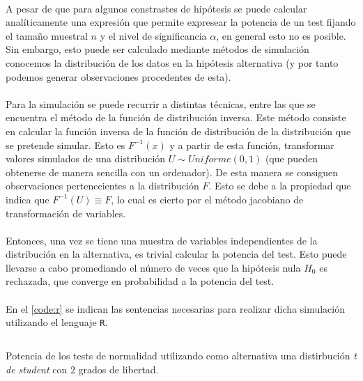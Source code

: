 \documentclass[a4paper, spanish]{article}
\begin{document}
    \paragraph{}
    A pesar de que para algunos constrastes de hipótesis se puede calcular analíticamente una expresión que permite expresear la potencia de un test fijando el tamaño muestral $n$ y el nivel de significancia $\alpha$, en general esto no es posible. Sin embargo, esto puede ser calculado mediante métodos de simulación conocemos la distribución de los datos en la hipótesis alternativa (y por tanto podemos generar observaciones procedentes de esta).

    \paragraph{}
    Para la simulación se puede recurrir a distintas técnicas, entre las que se encuentra el método de la función de distribución inversa. Este método consiste en calcular la función inversa de la función de distribución de la distribución que se pretende simular. Esto es $F^{-1}(x)$ y a partir de esta función, transformar valores simulados de una distribución $U \sim Uniforme(0,1)$ (que pueden obtenerse de manera sencilla con un ordenador). De esta manera se consiguen observaciones pertenecientes a la distribución $F$. Esto se debe a la propiedad que indica que $F^{-1}(U) \equiv F$, lo cual es cierto por el método jacobiano de transformación de variables.

    \paragraph{}
    Entonces, una vez se tiene una muestra de variables independientes de la distribución en la alternativa, es trivial calcular la potencia del test. Esto puede llevarse a cabo promediando el número de veces que la hipótesis nula $H_0$ es rechazada, que converge en probabilidad a la potencia del test.


    \paragraph{}
    En el \autoref{code:r} se indican las sentencias necesarias para realizar dicha simulación utilizando el lenguaje \texttt{R}.

    \begin{listing}[htb!]
      \centering
      \inputminted{R}{./normality-testing.r}
      \caption{Potencia de los tests de normalidad utilizando como alternativa una distirbución \emph{t de student} con $2$ grados de libertad.}
      \label{code:r}
    \end{listing}
\end{document}
